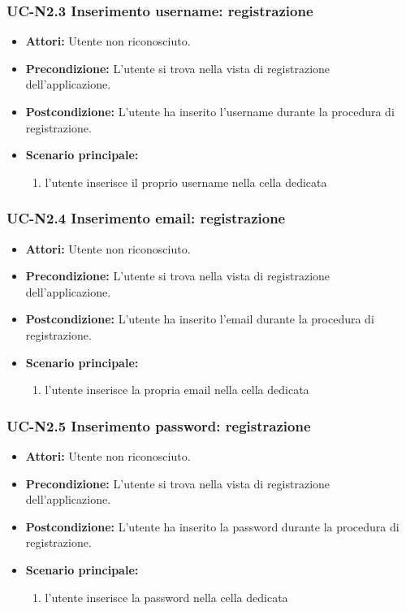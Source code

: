 \subsubsection{UC-N2.3 Inserimento username: registrazione}
\begin{itemize}
	\item \textbf{Attori: }Utente non riconosciuto.
	\item \textbf{Precondizione: }L'utente si trova nella vista 		di registrazione dell'applicazione.
	\item \textbf{Postcondizione: }L'utente ha inserito l'username durante la procedura di registrazione.
	\item \textbf{Scenario principale: }
	\begin{enumerate}
		\item l'utente inserisce il proprio username nella cella dedicata
	\end{enumerate}
\end{itemize}

\subsubsection{UC-N2.4 Inserimento email: registrazione}
\begin{itemize}
	\item \textbf{Attori: }Utente non riconosciuto.
	\item \textbf{Precondizione: }L'utente si trova nella vista 		di registrazione dell'applicazione.
	\item \textbf{Postcondizione: }L'utente ha inserito l'email durante la procedura di registrazione.
	\item \textbf{Scenario principale: }
	\begin{enumerate}
		\item l'utente inserisce la propria email nella cella dedicata
	\end{enumerate}
\end{itemize}

\subsubsection{UC-N2.5 Inserimento password: registrazione}
\begin{itemize}
	\item \textbf{Attori: }Utente non riconosciuto.
	\item \textbf{Precondizione: }L'utente si trova nella vista 		di registrazione dell'applicazione.
	\item \textbf{Postcondizione: }L'utente ha inserito la password durante la procedura di registrazione.
	\item \textbf{Scenario principale: }
	\begin{enumerate}
		\item l'utente inserisce la password nella cella dedicata
	\end{enumerate}
\end{itemize}


